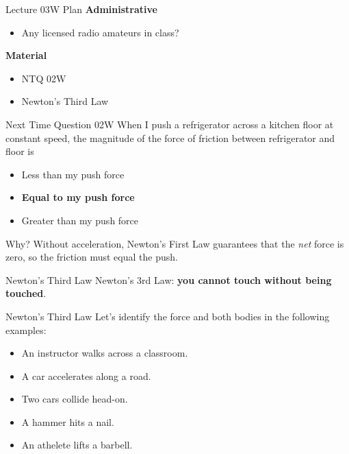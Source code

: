 \documentclass[english]{beamer}
\begin{document}
\begin{frame}{Lecture 03W Plan}
  \textbf{Administrative}
  \begin{itemize}
    \item Any licensed radio amateurs in class?
  \end{itemize}
  \textbf{Material}
  \begin{itemize}
    \item NTQ 02W
    \item Newton's Third Law
  \end{itemize}
\end{frame}

\begin{frame}{Next Time Question 02W}
  When I push a refrigerator across a kitchen floor at constant speed,
  the magnitude of the force of friction between refrigerator and floor is\\
  \begin{itemize}
    \item Less than my push force
    \item \textbf{Equal to my push force}
    \item Greater than my push force
  \end{itemize}
  Why? Without acceleration, Newton's First Law guarantees that the \emph{net} force is zero, so the friction must equal the push.
\end{frame}

\begin{frame}{Newton's Third Law}
  Newton's 3rd Law: \textbf{you cannot touch without being touched}.
\end{frame}

\begin{frame}{Newton's Third Law}
  Let's identify the force and both bodies in the following examples:
  \begin{itemize}
    \item An instructor walks across a classroom.
    \item A car accelerates along a road.
    \item Two cars collide head-on.
    \item A hammer hits a nail.
    \item An athelete lifts a barbell.
  \end{itemize}
\end{frame}
\end{document}
